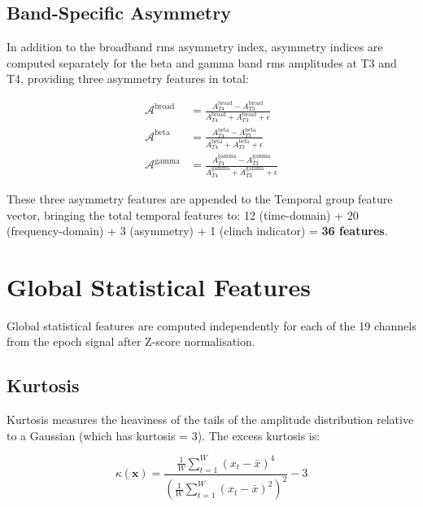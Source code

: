 \subsection{Band-Specific Asymmetry}

In addition to the broadband \acrshort{rms} asymmetry index,
asymmetry indices are computed separately for the beta and
gamma band \acrshort{rms} amplitudes at T3 and T4, providing
three asymmetry features in total:

\begin{align}
\mathcal{A}^{\text{broad}} &= \frac{A_{T4}^{\text{broad}}
- A_{T3}^{\text{broad}}}{A_{T4}^{\text{broad}}
+ A_{T3}^{\text{broad}} + \epsilon} \\
\mathcal{A}^{\text{beta}} &= \frac{A_{T4}^{\text{beta}}
- A_{T3}^{\text{beta}}}{A_{T4}^{\text{beta}}
+ A_{T3}^{\text{beta}} + \epsilon} \\
\mathcal{A}^{\text{gamma}} &= \frac{A_{T4}^{\text{gamma}}
- A_{T3}^{\text{gamma}}}{A_{T4}^{\text{gamma}}
+ A_{T3}^{\text{gamma}} + \epsilon}
\end{align}

These three asymmetry features are appended to the Temporal
group feature vector, bringing the total temporal features to:
12 (time-domain) + 20 (frequency-domain) + 3 (asymmetry)
+ 1 (clinch indicator) = \textbf{36 features}.

\section{Global Statistical Features}
\label{sec:fe_global}

Global statistical features are computed independently for
each of the 19 channels from the epoch signal after
Z-score normalisation.

\subsection{Kurtosis}

Kurtosis measures the heaviness of the tails of the
amplitude distribution relative to a Gaussian (which has
kurtosis = 3). The excess kurtosis is:

\begin{equation}
\kappa(\mathbf{x}) = \frac{\frac{1}{W}\sum_{t=1}^{W}
(x_t - \bar{x})^4}{\left(\frac{1}{W}\sum_{t=1}^{W}
(x_t - \bar{x})^2\right)^2} - 3
\label{eq:kurtosis}
\end{equation}

